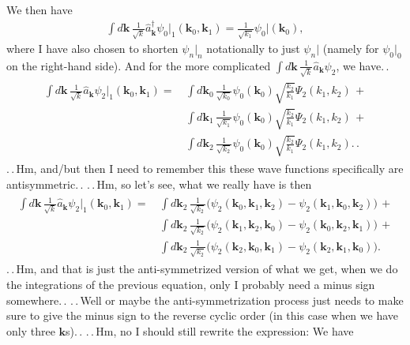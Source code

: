 \documentclass{report}
\begin{document}
We then have
\begin{align}
	\int d\mathbf{k}\, 
		\frac{1}{\sqrt{k}} \hat a_\mathbf{k}^\dagger \psi_0 \big|_1
			(\mathbf{k}_0, \mathbf{k}_1) 
	=
		\frac{1}{\sqrt{k_1}}
			\psi_0\big|(\mathbf{k}_0),
\end{align}
where I have also chosen to shorten $\psi_n |_n$ notationally to just $\psi_n |$ (namely for $\psi_0 |_0$ on the right-hand side). And for the more complicated 
$\int d\mathbf{k}\, 
\frac{1}{\sqrt{k}} \hat a_\mathbf{k} \psi_2$, 
we have.\,.
\begin{align}
\begin{aligned}
	\int d\mathbf{k}\, 
		\frac{1}{\sqrt{k}} \hat a_\mathbf{k} \psi_2 \big|_1
			(\mathbf{k}_0, \mathbf{k}_1) 
	=
		&\,\int d\mathbf{k}_0\, \frac{1}{\sqrt{k_0}}
			\psi_0(\mathbf{k}_0)
			\sqrt{\frac{k_2}{k_1}}
			\Psi_2(k_1, k_2)
		\,+\\
		&\,\int d\mathbf{k}_1\, \frac{1}{\sqrt{k_1}}
			\psi_0(\mathbf{k}_0)
			\sqrt{\frac{k_2}{k_1}}
			\Psi_2(k_1, k_2)
		\,+\\
		&\,\int d\mathbf{k}_2\, \frac{1}{\sqrt{k_2}}
			\psi_0(\mathbf{k}_0)
			\sqrt{\frac{k_2}{k_1}}
			\Psi_2(k_1, k_2).\,.
\end{aligned}
\end{align}
.\,.\,Hm, and/but then I need to remember this these wave functions specifically are antisymmetric.\,. 
.\,.\,Hm, so let's see, what we really have is then %
\begin{align}
\begin{aligned}
	\int d\mathbf{k}\, 
		\frac{1}{\sqrt{k}} \hat a_\mathbf{k} \psi_2 \big|_1
			(\mathbf{k}_0, \mathbf{k}_1) 
	=
		&\,
			\int d\mathbf{k}_2\, \frac{1}{\sqrt{k_2}} \big(
				\psi_2(\mathbf{k}_0, \mathbf{k}_1, \mathbf{k}_2) -
				\psi_2(\mathbf{k}_1, \mathbf{k}_0, \mathbf{k}_2) 
			\big)\, +
		\\&\,
			\int d\mathbf{k}_2\, \frac{1}{\sqrt{k_2}} \big(
				\psi_2(\mathbf{k}_1, \mathbf{k}_2, \mathbf{k}_0) -
				\psi_2(\mathbf{k}_0, \mathbf{k}_2, \mathbf{k}_1)
			\big)\, +
		\\&\,
			\int d\mathbf{k}_2\, \frac{1}{\sqrt{k_2}} \big(
				\psi_2(\mathbf{k}_2, \mathbf{k}_0, \mathbf{k}_1) -
				\psi_2(\mathbf{k}_2, \mathbf{k}_1, \mathbf{k}_0) 
			\big).
\end{aligned}
\end{align}
.\,.\,Hm, and that is just the anti-symmetrized version of what we get, when we do the integrations of the previous equation, only I probably need a minus sign somewhere.\,. .\,.\,Well or maybe the anti-symmetrization process just needs to make sure to give the minus sign to the reverse cyclic order (in this case when we have only three $\mathbf{k}$s).\,. .\,.\,Hm, no I should still rewrite the expression: We have
\end{document}
